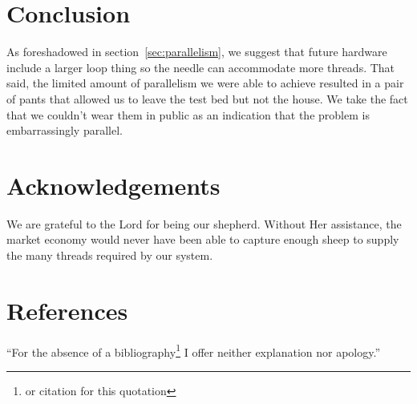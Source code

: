 \documentclass[letterpaper,twocolumn,12pt]{article}
\begin{document}
\section{Conclusion}
As foreshadowed in section~\ref{sec:parallelism}, we suggest that future hardware include a larger loop thing so the needle can accommodate more threads.
That said, the limited amount of parallelism we were able to achieve resulted in a pair of pants that allowed us to leave the test bed but not the house.
We take the fact that we couldn't wear them in public as an indication that the problem is embarrassingly parallel.

\section*{Acknowledgements}
We are grateful to the Lord for being our shepherd.
Without Her assistance, the market economy would never have been able to capture enough sheep to supply the many threads required by our system.

\section*{References}
``For the absence of a bibliography\footnote{or citation for this quotation} I offer neither explanation nor apology.''
\end{document}
